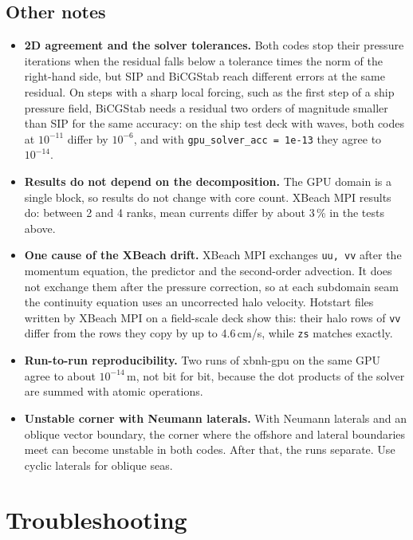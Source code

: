 \documentclass[11pt,a4paper]{article}
\newcommand{\code}[1]{\texttt{#1}}
\begin{document}
\subsection{Other notes}
\begin{itemize}
\item \textbf{2D agreement and the solver tolerances.} Both codes stop their pressure iterations when the
residual falls below a tolerance times the norm of the right-hand side, but SIP and BiCGStab reach different
errors at the same residual. On steps with a sharp local forcing, such as the first step of a ship
pressure field, BiCGStab needs a residual two orders of magnitude smaller than SIP for the same accuracy:
on the ship test deck with waves, both codes at $10^{-11}$ differ by $10^{-6}$, and with
\code{gpu\_solver\_acc = 1e-13} they agree to $10^{-14}$.
\item \textbf{Results do not depend on the decomposition.} The GPU domain is a single block, so results
do not change with core count. XBeach MPI results do: between 2 and 4 ranks, mean currents differ by
about 3\,\% in the tests above.
\item \textbf{One cause of the XBeach drift.} XBeach MPI exchanges \code{uu, vv} after the momentum
equation, the predictor and the second-order advection. It does not exchange them after the pressure
correction, so at each subdomain seam the continuity equation uses an uncorrected halo velocity. Hotstart
files written by XBeach MPI on a field-scale deck show this: their halo rows of \code{vv} differ from the rows they copy by up to
4.6\,cm/s, while \code{zs} matches exactly.
\item \textbf{Run-to-run reproducibility.} Two runs of xbnh-gpu on the same GPU agree to about
$10^{-14}$\,m, not bit for bit, because the dot products of the solver are summed with atomic
operations.
\item \textbf{Unstable corner with Neumann laterals.} With Neumann laterals and an oblique vector
boundary, the corner where the offshore and lateral boundaries meet can become unstable in both codes.
After that, the runs separate. Use cyclic laterals for oblique seas.
\end{itemize}

\section{Troubleshooting}
\end{document}
